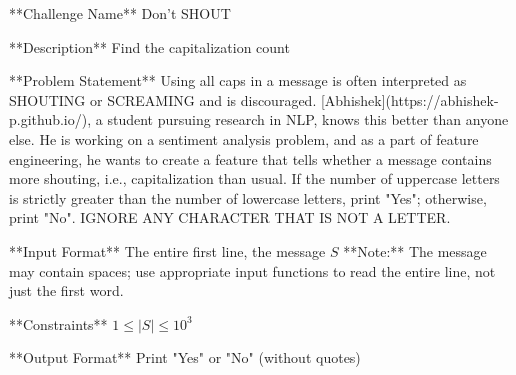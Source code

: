 **Challenge Name**  
Don't SHOUT

**Description**  
Find the capitalization count

**Problem Statement**  
Using all caps in a message is often interpreted as SHOUTING or SCREAMING and is discouraged. [Abhishek](https://abhishek-p.github.io/), a student pursuing research in NLP, knows this better than anyone else. He is working on a sentiment analysis problem, and as a part of feature engineering, he wants to create a feature that tells whether a message contains more shouting, i.e., capitalization than usual. If the number of uppercase letters is strictly greater than the number of lowercase letters, print "Yes"; otherwise, print "No". IGNORE ANY CHARACTER THAT IS NOT A LETTER.

**Input Format**  
The entire first line, the message $S$  
**Note:** The message may contain spaces; use appropriate input functions to read the entire line, not just the first word.

**Constraints**  
$1 \leq |S| \leq 10^3$

**Output Format**  
Print "Yes" or "No" (without quotes)